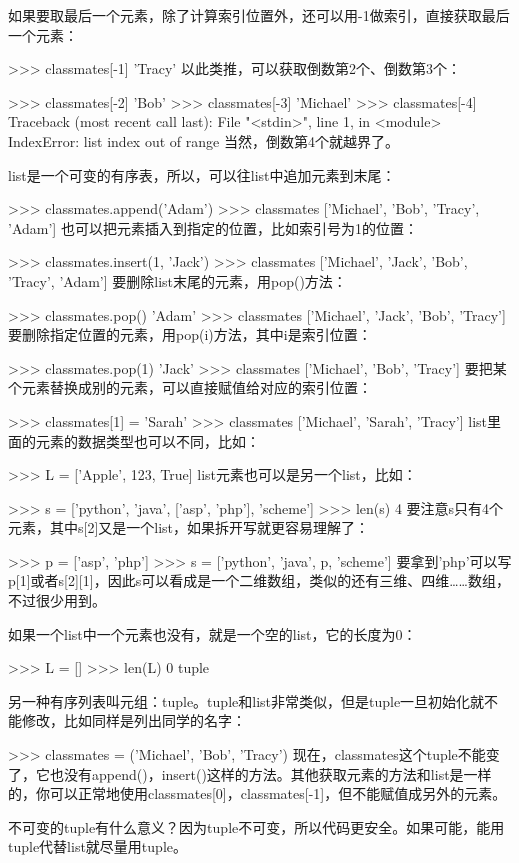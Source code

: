 如果要取最后一个元素，除了计算索引位置外，还可以用-1做索引，直接获取最后一个元素：

>>> classmates[-1]
'Tracy'
以此类推，可以获取倒数第2个、倒数第3个：

>>> classmates[-2]
'Bob'
>>> classmates[-3]
'Michael'
>>> classmates[-4]
Traceback (most recent call last):
  File "<stdin>", line 1, in <module>
IndexError: list index out of range
当然，倒数第4个就越界了。

list是一个可变的有序表，所以，可以往list中追加元素到末尾：

>>> classmates.append('Adam')
>>> classmates
['Michael', 'Bob', 'Tracy', 'Adam']
也可以把元素插入到指定的位置，比如索引号为1的位置：

>>> classmates.insert(1, 'Jack')
>>> classmates
['Michael', 'Jack', 'Bob', 'Tracy', 'Adam']
要删除list末尾的元素，用pop()方法：

>>> classmates.pop()
'Adam'
>>> classmates
['Michael', 'Jack', 'Bob', 'Tracy']
要删除指定位置的元素，用pop(i)方法，其中i是索引位置：

>>> classmates.pop(1)
'Jack'
>>> classmates
['Michael', 'Bob', 'Tracy']
要把某个元素替换成别的元素，可以直接赋值给对应的索引位置：

>>> classmates[1] = 'Sarah'
>>> classmates
['Michael', 'Sarah', 'Tracy']
list里面的元素的数据类型也可以不同，比如：

>>> L = ['Apple', 123, True]
list元素也可以是另一个list，比如：

>>> s = ['python', 'java', ['asp', 'php'], 'scheme']
>>> len(s)
4
要注意s只有4个元素，其中s[2]又是一个list，如果拆开写就更容易理解了：

>>> p = ['asp', 'php']
>>> s = ['python', 'java', p, 'scheme']
要拿到'php'可以写p[1]或者s[2][1]，因此s可以看成是一个二维数组，类似的还有三维、四维……数组，不过很少用到。

如果一个list中一个元素也没有，就是一个空的list，它的长度为0：

>>> L = []
>>> len(L)
0
tuple

另一种有序列表叫元组：tuple。tuple和list非常类似，但是tuple一旦初始化就不能修改，比如同样是列出同学的名字：

>>> classmates = ('Michael', 'Bob', 'Tracy')
现在，classmates这个tuple不能变了，它也没有append()，insert()这样的方法。其他获取元素的方法和list是一样的，你可以正常地使用classmates[0]，classmates[-1]，但不能赋值成另外的元素。

不可变的tuple有什么意义？因为tuple不可变，所以代码更安全。如果可能，能用tuple代替list就尽量用tuple。

